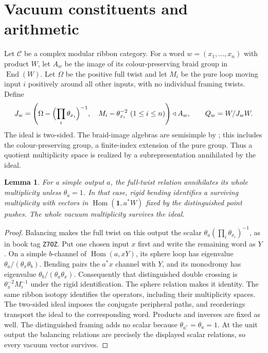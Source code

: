 \documentclass[10pt]{amsart}
\newcommand{\one}{\mathbf1}\newcommand{\C}{\mathcal C}
\newcommand{\Hom}{\operatorname{Hom}}\newcommand{\Irr}{\operatorname{Irr}}
\newtheorem{lemma}[theorem]{Lemma}
\begin{document}
\section{Vacuum constituents and arithmetic}
Let $\C$ be a complex modular ribbon category. For a word
$w=(x_1,\ldots,x_n)$ with product $W$, let $A_w$ be the image
of its colour-preserving braid group in $\operatorname{End}(W)$.
Let $\Omega$ be the positive full twist and let $M_i$ be the
pure loop moving input $i$ positively around all other inputs,
with no individual framing twists. Define
\[
 J_w=\left(\Omega-\Bigl(\prod_i\theta_{x_i}\Bigr)^{-1},\quad
                    M_i-\theta_{x_i}^{-2}\ (1\le i\le n)\right)
                    \triangleleft A_w,
 \qquad Q_w=W/J_wW.
\]
The ideal is two-sided. The braid-image algebras are semisimple
by \cite[Theorem 1.1]{GS}; this includes the colour-preserving
group, a finite-index extension of the pure group.
Thus a quotient multiplicity space is realized by a
subrepresentation annihilated by the ideal.

\begin{lemma}\label{sphere-bending}
For a simple output $a$, the full-twist relation annihilates
its whole multiplicity unless $\theta_a=1$. In that case,
rigid bending identifies a surviving multiplicity with vectors
in $\Hom(\one,a^*W)$ fixed by the distinguished point pushes.
The whole vacuum multiplicity survives the ideal.
\end{lemma}
\begin{proof}
Balancing makes the full twist on this output the scalar
$\theta_a(\prod_i\theta_{x_i})^{-1}$, as in book tag
\texttt{Z7OZ}. Put one chosen input $x$ first and write
the remaining word as $Y$. On a simple $b$-channel of
$\Hom(a,xY)$, its sphere loop has eigenvalue
$\theta_a/(\theta_x\theta_b)$. Bending pairs the
$a^*x$ channel with $Y$, and its monodromy has eigenvalue
$\theta_b/(\theta_a\theta_x)$. Consequently that
distinguished double crossing is $\theta_x^{-2}M_i^{-1}$
under the rigid identification. The sphere relation makes
it identity. The same ribbon isotopy identifies the operators,
including their multiplicity spaces. The two-sided ideal
imposes the conjugate peripheral paths, and reorderings
transport the ideal to the corresponding word. Products
and inverses are fixed as well. The distinguished framing
adds no scalar because $\theta_{a^*}=\theta_a=1$.
At the unit output the balancing relations are precisely
the displayed scalar relations, so every vacuum vector survives.
\end{proof}
\end{document}
